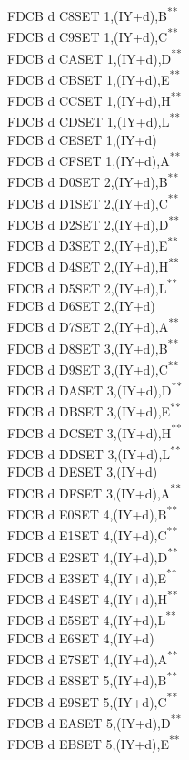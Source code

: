 \documentclass[12pt,twoside,openright,a4paper]{book}
\newcommand{\UNDOC}{\textnormal{\textsuperscript{**}}}
\begin{document}
\begin{multicols}{3}
{\begin{tabbing}
	FDCB d C8\>SET 1,(IY+d),B\UNDOC\\
	FDCB d C9\>SET 1,(IY+d),C\UNDOC\\
	FDCB d CA\>SET 1,(IY+d),D\UNDOC\\
	FDCB d CB\>SET 1,(IY+d),E\UNDOC\\
	FDCB d CC\>SET 1,(IY+d),H\UNDOC\\
	FDCB d CD\>SET 1,(IY+d),L\UNDOC\\
	FDCB d CE\>SET 1,(IY+d)\\
	FDCB d CF\>SET 1,(IY+d),A\UNDOC\\
	FDCB d D0\>SET 2,(IY+d),B\UNDOC\\
	FDCB d D1\>SET 2,(IY+d),C\UNDOC\\
	FDCB d D2\>SET 2,(IY+d),D\UNDOC\\
	FDCB d D3\>SET 2,(IY+d),E\UNDOC\\
	FDCB d D4\>SET 2,(IY+d),H\UNDOC\\
	FDCB d D5\>SET 2,(IY+d),L\UNDOC\\
	FDCB d D6\>SET 2,(IY+d)\\
	FDCB d D7\>SET 2,(IY+d),A\UNDOC\\
	FDCB d D8\>SET 3,(IY+d),B\UNDOC\\
	FDCB d D9\>SET 3,(IY+d),C\UNDOC\\
	FDCB d DA\>SET 3,(IY+d),D\UNDOC\\
	FDCB d DB\>SET 3,(IY+d),E\UNDOC\\
	FDCB d DC\>SET 3,(IY+d),H\UNDOC\\
	FDCB d DD\>SET 3,(IY+d),L\UNDOC\\
	FDCB d DE\>SET 3,(IY+d)\\
	FDCB d DF\>SET 3,(IY+d),A\UNDOC\\
	FDCB d E0\>SET 4,(IY+d),B\UNDOC\\
	FDCB d E1\>SET 4,(IY+d),C\UNDOC\\
	FDCB d E2\>SET 4,(IY+d),D\UNDOC\\
	FDCB d E3\>SET 4,(IY+d),E\UNDOC\\
	FDCB d E4\>SET 4,(IY+d),H\UNDOC\\
	FDCB d E5\>SET 4,(IY+d),L\UNDOC\\
	FDCB d E6\>SET 4,(IY+d)\\
	FDCB d E7\>SET 4,(IY+d),A\UNDOC\\
	FDCB d E8\>SET 5,(IY+d),B\UNDOC\\
	FDCB d E9\>SET 5,(IY+d),C\UNDOC\\
	FDCB d EA\>SET 5,(IY+d),D\UNDOC\\
	FDCB d EB\>SET 5,(IY+d),E\UNDOC\\

\end{tabbing}}
\end{multicols}
\end{document}
